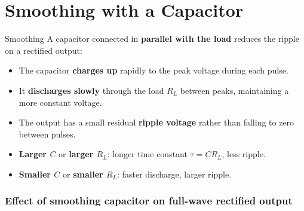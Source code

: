 \pagebreak

\section{Smoothing with a Capacitor}

\begin{keybox}{Smoothing}
A capacitor connected in \textbf{parallel with the load} reduces the ripple on a rectified output:
\begin{itemize}[itemsep=2pt]
  \item The capacitor \textbf{charges up} rapidly to the peak voltage during each pulse.
  \item It \textbf{discharges slowly} through the load $R_L$ between peaks, maintaining a more constant voltage.
  \item The output has a small residual \textbf{ripple voltage} rather than falling to zero between pulses.
  \item \textbf{Larger $C$} or \textbf{larger $R_L$}: longer time constant $\tau = CR_L$, less ripple.
  \item \textbf{Smaller $C$} or \textbf{smaller $R_L$}: faster discharge, larger ripple.
\end{itemize}
\end{keybox}

\subsubsection*{Effect of smoothing capacitor on full-wave rectified output}

\def\arch{1.7*pi/3}   

\begin{center}
\end{center}

